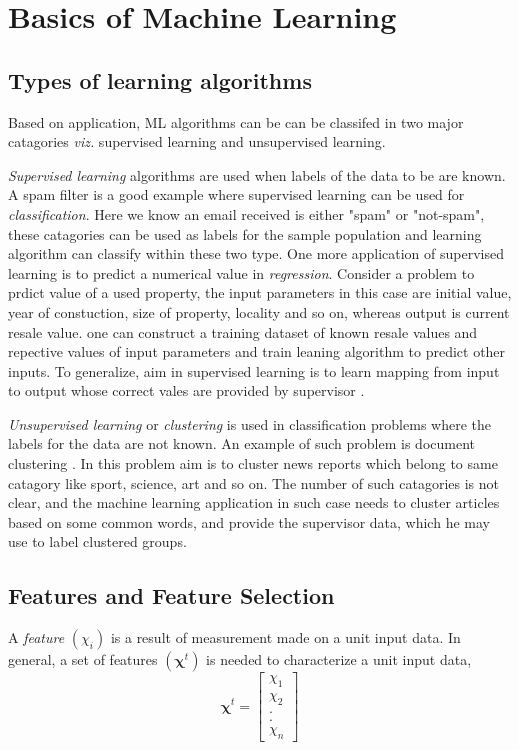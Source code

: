 \section{Basics of Machine Learning}
\label{sec:c3basics}

\subsection{Types of learning algorithms}
Based on application, ML algorithms can be can be classifed in two major catagories \emph{viz.} supervised learning and unsupervised learning. 

\emph{Supervised learning} algorithms are used when labels of the data to be are known. A spam filter is a good example where supervised learning can be used for \emph{classification}. Here we know an email received is either "spam" or "not-spam", these catagories can be used as labels for the sample population and learning algorithm can classify within these two type.  One more application of supervised learning is to predict a numerical value in \emph{regression}. Consider a problem to prdict value of a used property, the input parameters in this case are initial value, year of constuction, size of property, locality and so on, whereas output is current resale value. one can construct a training dataset of known resale values and repective values of input parameters and train leaning algorithm to predict other inputs. To generalize, aim in supervised learning is to learn mapping from input to output whose correct vales are provided by supervisor \cite{Alpaydin2004}.

\emph{Unsupervised learning} or \emph{clustering} is used in classification problems where the labels for the data are not known. An example of such problem is document clustering \cite{Alpaydin2004}. In this problem aim is to cluster news reports which belong to same catagory like sport, science, art and so on. The number of such catagories is not clear, and the machine learning application in such case needs to cluster articles based on some common words, and provide the supervisor data, which he may use to label clustered groups.

\subsection{Features and Feature Selection}
A \emph{feature} $(\chi_i)$ is a result of measurement made on a unit input data. In general, a set of features $(\boldsymbol{\chi}^t)$ is needed to characterize a unit input data,
\[ \boldsymbol{\chi}^t = 
\left[ \begin{array}{c}
\chi_1\\
\chi_2 \\
.\\
.\\
\chi_n \end{array} \right]\]  

